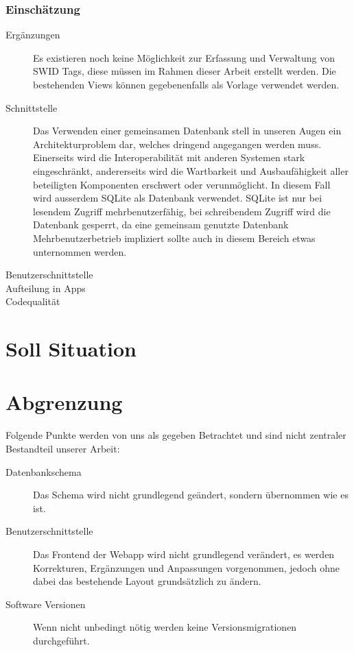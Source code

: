 \subsubsection{Einschätzung}
\begin{description}
	\item[Ergänzungen] Es existieren noch keine Möglichkeit zur Erfassung und
	Verwaltung von SWID Tags, diese müssen im Rahmen dieser Arbeit erstellt werden.
	Die bestehenden Views können gegebenenfalls als Vorlage verwendet werden.
	
	\item[Schnittstelle] Das Verwenden einer gemeinsamen Datenbank stell in unseren
	Augen ein Architekturproblem dar, welches dringend angegangen werden muss.
	Einerseits wird die Interoperabilität mit anderen Systemen stark eingeschränkt,
	andererseits wird die Wartbarkeit und Ausbaufähigkeit aller beteiligten
	Komponenten erschwert oder verunmöglicht. In diesem Fall wird ausserdem SQLite
	als Datenbank verwendet. SQLite ist nur bei lesendem Zugriff mehrbenutzerfähig,
	bei schreibendem Zugriff wird die Datenbank gesperrt, da eine gemeinsam
	genutzte Datenbank Mehrbenutzerbetrieb impliziert sollte auch in diesem Bereich
	etwas unternommen werden. 
	
	\item[Benutzerschnittstelle] 
	
	\item[Aufteilung in Apps] 
	
	\item[Codequalität]
	
\end{description}

\section{Soll Situation}



\section{Abgrenzung}
Folgende Punkte werden von uns als gegeben Betrachtet und sind nicht zentraler
Bestandteil unserer Arbeit:
\begin{description}
	\item[Datenbankschema] Das Schema wird nicht grundlegend geändert, sondern
	übernommen wie es ist.
	
	\item[Benutzerschnittstelle] Das Frontend der Webapp wird nicht grundlegend
	verändert, es werden Korrekturen, Ergänzungen und Anpassungen vorgenommen,
	jedoch ohne dabei das bestehende Layout grundsätzlich zu ändern.
	
	\item[Software Versionen] Wenn nicht unbedingt nötig werden keine
	Versionsmigrationen durchgeführt.
\end{description}


